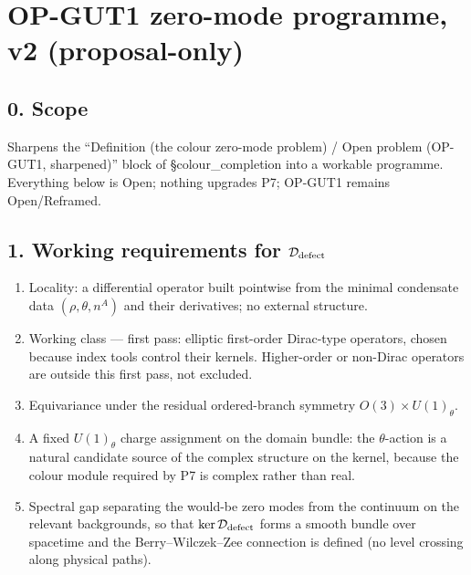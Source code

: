 \section*{OP-GUT1 zero-mode programme, v2 (proposal-only)}

\subsection*{0. Scope}
Sharpens the ``Definition (the colour zero-mode problem) / Open
problem (OP-GUT1, sharpened)'' block of \S colour\_completion into
a workable programme.
Everything below is Open; nothing upgrades P7; OP-GUT1 remains
Open/Reframed.

\subsection*{1. Working requirements for $\mathcal D_{\rm defect}$}
\begin{enumerate}
  \item Locality: a differential operator built pointwise from the
    minimal condensate data $(\rho,\theta,n^A)$ and their
    derivatives; no external structure.
  \item Working class --- first pass: elliptic first-order
    Dirac-type operators, chosen because index tools control their
    kernels.  Higher-order or non-Dirac operators are outside this
    first pass, not excluded.
  \item Equivariance under the residual ordered-branch symmetry
    $O(3)\times U(1)_\theta$.
  \item A fixed $U(1)_\theta$ charge assignment on the domain
    bundle: the $\theta$-action is a natural candidate source of
    the complex structure on the kernel, because the colour module
    required by P7 is complex rather than real.
  \item Spectral gap separating the would-be zero modes from the
    continuum on the relevant backgrounds, so that
    $\ker\mathcal D_{\rm defect}$ forms a smooth bundle over
    spacetime and the Berry--Wilczek--Zee connection is defined
    (no level crossing along physical paths).
\end{enumerate}

